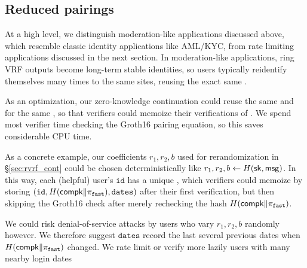 \subsection{Reduced pairings}
\label{sec:reduced_pairings}

At a high level, we distinguish moderation-like applications discussed
above, which resemble classic identity applications like AML/KYC, from
rate limiting applications discussed in the next section. 
%
In moderation-like applications, ring VRF outputs become long-term
stable identities, so users typically reidentify themselves many times
to the same sites, reusing the exact same \msg.

As an optimization, our zero-knowledge continuation could reuse the
same \compk and \pifast for the same \msg, so that verifiers could
memoize their verifications of \pifast.  We spend most verifier time
checking the Groth16 pairing equation, so this saves considerable CPU time. %

As a concrete example, our coefficients $r_1,r_2,b$ used for
rerandomization in \S\ref{sec:rvrf_cont} could be chosen
deterministically like $r_1,r_2,b \leftarrow H(\mathsf{sk},\mathsf{msg})$.
In this way, each (helpful) user's $\mathtt{id}$ has a unique \pifast,
which verifiers could memoize by storing
 $(\mathtt{id},H(\mathsf{compk} \| \pi_{\mathtt{fast}}),\mathtt{dates})$
after their first verification, but then skipping the Groth16 check
 after merely rechecking the hash $H(\mathsf{compk} \| \pi_{\mathtt{fast}})$.

We could risk denial-of-service attacks by users who vary $r_1,r_2,b$ 
randomly however.  We therefore suggest $\mathtt{dates}$ record the last
several previous dates when $H(\mathsf{compk} \| \pi_{\mathtt{fast}})$ changed.
We rate limit or verify more lazily users with many nearby login dates

